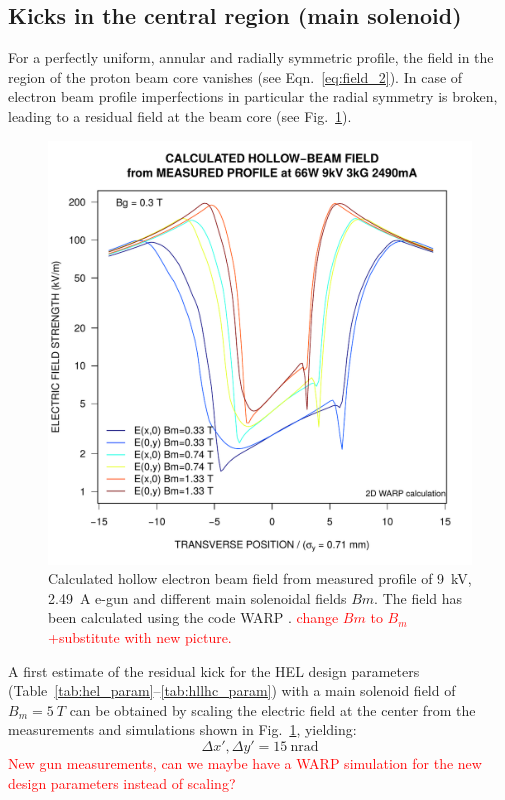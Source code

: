 \documentclass[%
 reprint,
 amsmath,amssymb,
 aps,
prstab,
]{revtex4-1}
\newcommand{\q}[2]{\ensuremath{#1\ \mathrm{#2}}} %
\begin{document}
\subsection{Kicks in the central region (main solenoid)}
\label{core:sec:2}
For a perfectly uniform, annular and radially symmetric profile, the field in the region of the proton beam core vanishes (see Eqn.~\ref{eq:field_2}). In case of electron beam profile imperfections in particular the radial symmetry is broken, leading to a residual field at the beam core (see Fig.~\ref{core:fig:1}).
\begin{figure}[h]
	\centering
	\includegraphics[width=1.0\linewidth]{e-beam_profile.png}
	\caption{Calculated hollow electron beam field from measured profile of 9~kV, 2.49~A e-gun and different main solenoidal fields $Bm$. The field has been calculated using the code WARP \cite{warp}. \textcolor{red}{change $Bm$ to $B_m$ +substitute with new picture.}}
	\label{core:fig:1}
\end{figure}
A first estimate of the residual kick for the HEL design parameters (Table~\ref{tab:hel_param}--\ref{tab:hllhc_param}) with a main solenoid field of $B_{m}=\SI{5}{T}$ can be obtained by scaling the electric field at the center from the measurements and simulations shown in Fig.~\ref{core:fig:1}, yielding:
\begin{equation}\label{eqn:kick_central}
\Delta x', \Delta y'=\q{15}{nrad}
\end{equation}
\textcolor{red}{New gun measurements, can we maybe have a WARP simulation for the new design parameters instead of scaling?}
\end{document}
